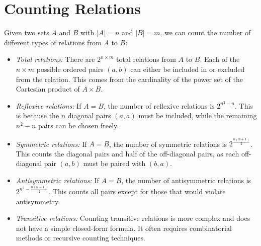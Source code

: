 \section{Counting Relations}

Given two sets \(A\) and \(B\) with \(|A| = n\) and \(|B| = m\), we can count the number of different types of relations from \(A\) to \(B\):

\begin{itemize}

	\item \emph{Total relations:} There are \(2^{n \times m}\) total relations from \(A\) to \(B\). Each of the 
		  \(n \times m\) possible ordered pairs \((a, b)\) can either be included in or excluded from the relation. This comes from the cardinality of 
		  the power set of the Cartesian product of \(A \times B\).

	\item \emph{Reflexive relations:} If \(A = B\), the number of reflexive relations is \(2^{n^2 - n}\). This is because 
		  the \(n\) diagonal pairs \((a, a)\) must be included, while the remaining \(n^2 - n\) pairs can be chosen freely.

	\item \emph{Symmetric relations:} If \(A = B\), the number of symmetric relations is \(2^{\frac{n(n+1)}{2}}\). This counts 
		  the diagonal pairs and half of the off-diagonal pairs, as each off-diagonal pair \((a, b)\) must be paired with \((b, a)\).

	\item \emph{Antisymmetric relations:} If \(A = B\), the number of antisymmetric relations is \(2^{n^2 - \frac{n(n-1)}{2}}\). 
		  This counts all pairs except for those that would violate antisymmetry.

	\item \emph{Transitive relations:} Counting transitive relations is more complex and does not have a simple closed-form formula. 
		  It often requires combinatorial methods or recursive counting techniques. 

\end{itemize}
